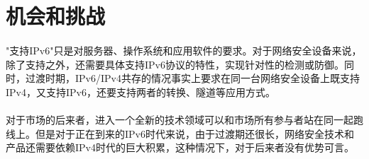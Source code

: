\documentclass[a4paper,14pt,openany]{article}
\begin{document}
\newpage
\section{机会和挑战}
\paragraph{}
"支持IPv6"只是对服务器、操作系统和应用软件的要求。对于网络安全设备来说，除了支持之外，还需要具体支持IPv6协议的特性，实现针对性的检测或防御。同时，过渡时期，IPv6/IPv4共存的情况事实上要求在同一台网络安全设备上既支持IPv4，又支持IPv6，还要支持两者的转换、隧道等应用方式。
\paragraph{}
对于市场的后来者，进入一个全新的技术领域可以和市场所有参与者站在同一起跑线上。但是对于正在到来的IPv6时代来说，由于过渡期还很长，网络安全技术和产品还需要依赖IPv4时代的巨大积累，这种情况下，对于后来者没有优势可言。
\end{document}
